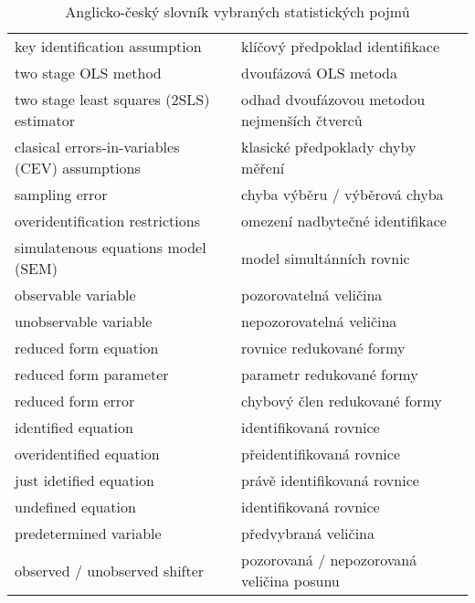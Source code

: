 \begin{table}
\begin{center}
\begin{tabular}{l l}
key identification assumption & klíčový předpoklad identifikace\\
two stage OLS method & dvoufázová OLS metoda\\
two stage least squares (2SLS) estimator & odhad dvoufázovou metodou nejmenších čtverců\\
clasical errors-in-variables (CEV) assumptions & klasické předpoklady chyby měření\\
sampling error & chyba výběru / výběrová chyba\\
overidentification restrictions & omezení nadbytečné identifikace\\
simulatenous equations model (SEM) & model simultánních rovnic\\
observable variable & pozorovatelná veličina\\
unobservable variable & nepozorovatelná veličina\\
reduced form equation & rovnice redukované formy\\
reduced form parameter & parametr redukované formy\\
reduced form error & chybový člen redukované formy\\
identified equation & identifikovaná rovnice\\
overidentified equation & přeidentifikovaná rovnice\\
just idetified equation & právě identifikovaná rovnice\\
undefined equation & identifikovaná rovnice\\
predetermined variable & předvybraná veličina\\
observed / unobserved shifter & pozorovaná / nepozorovaná veličina posunu
\end{tabular}
\caption{Anglicko-český slovník vybraných statistických pojmů}
\end{center}
\end{table}

